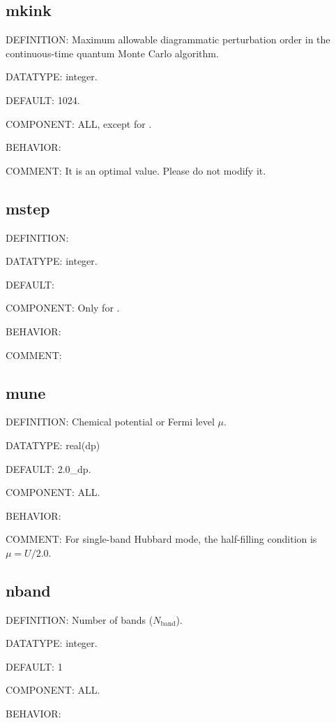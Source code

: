 \subsection{mkink}
{\color{red}DEFINITION:} Maximum allowable diagrammatic perturbation order in the continuous-time quantum Monte Carlo algorithm.

{\color{green}DATATYPE:} integer.

{\color{blue}DEFAULT:} 1024.

{\color{brown}COMPONENT:} ALL, except for {\daisy}.

{\color{purple}BEHAVIOR:}

{\color{olive}COMMENT:} It is an optimal value. Please do not modify it.

\subsection{mstep}
{\color{red}DEFINITION:}

{\color{green}DATATYPE:} integer.

{\color{blue}DEFAULT:}

{\color{brown}COMPONENT:} Only for {\daisy}.

{\color{purple}BEHAVIOR:}

{\color{olive}COMMENT:}

\subsection{mune}
{\color{red}DEFINITION:} Chemical potential or Fermi level $\mu$.

{\color{green}DATATYPE:} real(dp)

{\color{blue}DEFAULT:} 2.0\_dp.

{\color{brown}COMPONENT:} ALL.

{\color{purple}BEHAVIOR:}

{\color{olive}COMMENT:} For single-band Hubbard mode, the half-filling condition is $\mu = U/2.0$.

\subsection{nband}
{\color{red}DEFINITION:} Number of bands ($N_{\text{band}}$).

{\color{green}DATATYPE:} integer.

{\color{blue}DEFAULT:} 1

{\color{brown}COMPONENT:} ALL.

{\color{purple}BEHAVIOR:}

